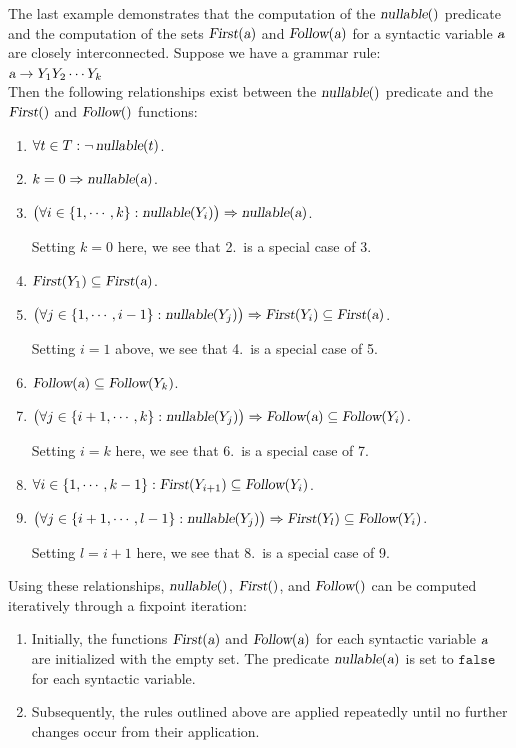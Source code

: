 \noindent
The last example demonstrates that the computation of the \(\textsl{nullable}()\) predicate and the computation of the sets \(\textsl{First}(\textsl{a})\) and \(\textsl{Follow}(\textsl{a})\) for a syntactic variable \(\textsl{a}\) are closely interconnected. Suppose we have a grammar rule:
\\[0.2cm]
\hspace*{1.3cm}
 \(\textsl{a} \rightarrow Y_1 Y_2 \cdots Y_k\)
\\[0.2cm]
Then the following relationships exist between the \(\textsl{nullable}()\) predicate and the \(\textsl{First}()\) and \(\textsl{Follow}()\) functions:
\begin{enumerate}
\item \(\forall t \in T: \neg\, \textsl{nullable}(t)\).
\item \(k = 0 \Rightarrow \textsl{nullable}(\textsl{a})\).
\item \(\bigl(\forall i \in \{1, \cdots, k\}: \textsl{nullable}(Y_i)\bigr) \Rightarrow
       \textsl{nullable}(\textsl{a})\).

      Setting \(k=0\) here, we see that 2.~is a special case of 3.
\item \(\textsl{First}(Y_1) \subseteq \textsl{First}(\textsl{a})\).
\item \(\bigl(\forall j \in \{1,\cdots,i-1\}: \textsl{nullable}(Y_j)\bigr) \Rightarrow
       \textsl{First}(Y_i) \subseteq \textsl{First}(\textsl{a})\).

       Setting \(i=1\) above, we see that 4.~is a special case of 5.
\item \(\textsl{Follow}(\textsl{a}) \subseteq \textsl{Follow}(Y_k)\).
\item \(\bigl(\forall j \in \{i+1, \cdots, k\}: \textsl{nullable}(Y_j)\bigr) \Rightarrow 
       \textsl{Follow}(\textsl{a}) \subseteq \textsl{Follow}(Y_i)\).

      Setting \(i=k\) here, we see that 6.~is a special case of 7.
\item \(\forall i \in \{1,\cdots,k-1\}:\textsl{First}(Y_{i+1}) \subseteq \textsl{Follow}(Y_i)\).
\item \(\bigl(\forall j \in \{i+1, \cdots, l-1\}: \textsl{nullable}(Y_j)\bigr) \Rightarrow 
       \textsl{First}(Y_l) \subseteq \textsl{Follow}(Y_i)\).

      Setting \(l=i+1\) here, we see that 8.~is a special case of 9.
\end{enumerate}
Using these relationships, \(\textsl{nullable}()\), \(\textsl{First}()\), and \(\textsl{Follow}()\) can be computed iteratively through a fixpoint iteration:
\begin{enumerate}
\item Initially, the functions \(\textsl{First}(\textsl{a})\) and \(\textsl{Follow}(\textsl{a})\) for each syntactic variable \(\textsl{a}\) are initialized with the empty set. The predicate \(\textsl{nullable}(\textsl{a})\) is set to \(\texttt{false}\) for each syntactic variable.
\item Subsequently, the rules outlined above are applied repeatedly until no further changes occur from their application.
\end{enumerate}

